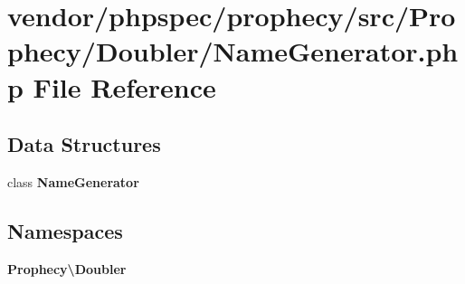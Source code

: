 \section{vendor/phpspec/prophecy/src/\+Prophecy/\+Doubler/\+Name\+Generator.php File Reference}
\label{_name_generator_8php}
\subsection*{Data Structures}
\begin{DoxyCompactItemize}
\item 
class {\bf Name\+Generator}
\end{DoxyCompactItemize}
\subsection*{Namespaces}
\begin{DoxyCompactItemize}
\item 
 {\bf Prophecy\textbackslash{}\+Doubler}
\end{DoxyCompactItemize}
